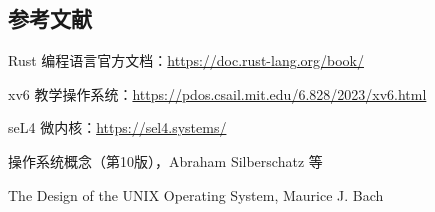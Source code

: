 \documentclass[UTF8,a4paper,12pt]{ctexart}
\begin{document}
\subsection{参考文献}

\begin{enumerate}[label={[\arabic*]}]
    \item Rust 编程语言官方文档：\url{https://doc.rust-lang.org/book/}
    \item xv6 教学操作系统：\url{https://pdos.csail.mit.edu/6.828/2023/xv6.html}
    \item seL4 微内核：\url{https://sel4.systems/}
    \item 操作系统概念（第10版），Abraham Silberschatz 等
    \item The Design of the UNIX Operating System, Maurice J. Bach
\end{enumerate}
\end{document}
